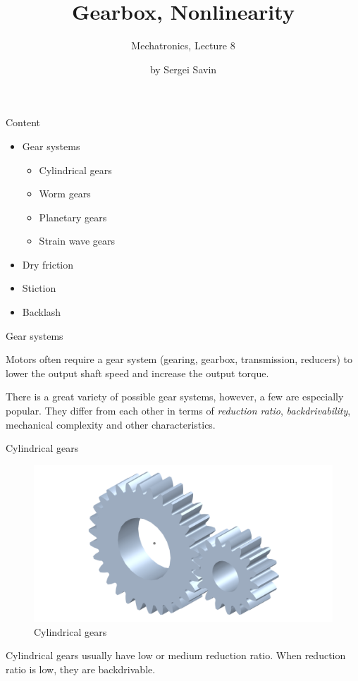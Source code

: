 \documentclass{beamer}
\title{Gearbox, Nonlinearity}
\subtitle{Mechatronics, Lecture 8}
\author{by Sergei Savin}
\date{\mydate}
\begin{document}
\maketitle



\begin{frame}{Content}
\begin{itemize}
\item Gear systems
\begin{itemize}
	\item Cylindrical gears
	\item Worm gears
	\item Planetary gears
	\item Strain wave gears
\end{itemize}
\item Dry friction
\item Stiction
\item Backlash
\end{itemize}
\end{frame}




\begin{frame}{Gear systems}
	\begin{flushleft}
		
		Motors often require a gear system (gearing, gearbox, transmission, reducers) to lower the output shaft speed and increase the output torque.
		
		\bigskip
		
		
		There is a great variety of possible gear systems, however, a few are especially popular. They differ from each other in terms of \emph{reduction ratio}, \emph{backdrivability}, mechanical complexity and other characteristics.
		
	\end{flushleft}
\end{frame}



\begin{frame}{Cylindrical gears}
	\begin{flushleft}
		
		\begin{figure}
			\centering
			\includegraphics[width=0.7\linewidth]{cylindrical}
			\caption{Cylindrical gears}
			\label{fig:cylindrical}
		\end{figure}
		
		Cylindrical gears usually have low or medium reduction ratio. When reduction ratio is low, they are backdrivable. 
		
	\end{flushleft}
\end{frame}
\end{document}
